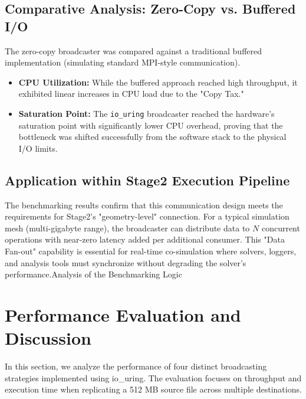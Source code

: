 \documentclass[
	a4paper,
	10pt,
	unnumberedsections,
	twoside, 
]{LTJournalArticle}
\begin{document}
\subsection{Comparative Analysis: Zero-Copy vs. Buffered I/O}
The zero-copy broadcaster was compared against a traditional buffered implementation (simulating standard MPI-style communication).

\begin{itemize}
\item \textbf{CPU Utilization:} While the buffered approach reached high throughput, it exhibited linear increases in CPU load due to the "Copy Tax."
\item \textbf{Saturation Point:} The \texttt{io\_uring} broadcaster reached the hardware's saturation point with significantly lower CPU overhead, proving that the bottleneck was shifted successfully from the software stack to the physical I/O limits.
\end{itemize}

\subsection{Application within Stage2 Execution Pipeline}
The benchmarking results confirm that this communication design meets the requirements for Stage2's "geometry-level" connection. For a typical simulation mesh (multi-gigabyte range), the broadcaster can distribute data to $N$ concurrent operations with near-zero latency added per additional consumer. This "Data Fan-out" capability is essential for real-time co-simulation where solvers, loggers, and analysis tools must synchronize without degrading the solver's performance.Analysis of the Benchmarking Logic


\section{Performance Evaluation and Discussion}
In this section, we analyze the performance of four distinct broadcasting strategies implemented using io\_uring. The evaluation focuses on throughput and execution time when replicating a 512 MB source file across multiple destinations.
\end{document}
